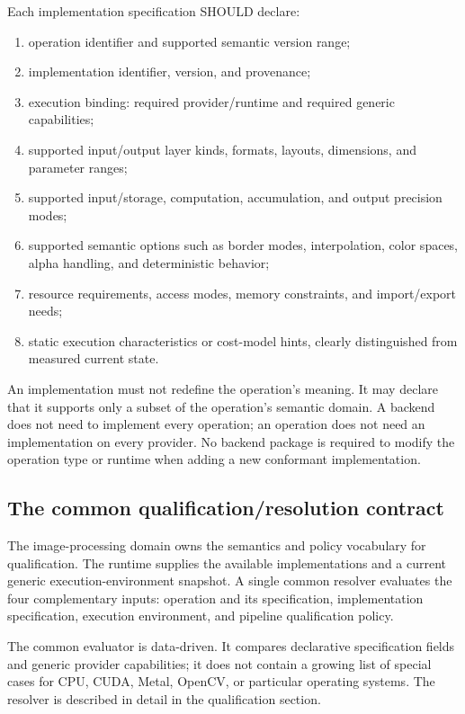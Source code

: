 \documentclass[11pt,a4paper,oneside]{article}
\begin{document}
Each implementation specification SHOULD declare:
\begin{enumerate}
  \item operation identifier and supported semantic version range;
  \item implementation identifier, version, and provenance;
  \item execution binding: required provider/runtime and required generic capabilities;
  \item supported input/output layer kinds, formats, layouts, dimensions, and parameter ranges;
  \item supported input/storage, computation, accumulation, and output precision modes;
  \item supported semantic options such as border modes, interpolation, color spaces, alpha handling, and deterministic behavior;
  \item resource requirements, access modes, memory constraints, and import/export needs;
  \item static execution characteristics or cost-model hints, clearly distinguished from measured current state.
\end{enumerate}

An implementation must not redefine the operation's meaning. It may declare that it supports only a subset of the operation's semantic domain. A backend does not need to implement every operation; an operation does not need an implementation on every provider. No backend package is required to modify the operation type or runtime when adding a new conformant implementation.

\subsection{The common qualification/resolution contract}

The image-processing domain owns the semantics and policy vocabulary for qualification. The runtime supplies the available implementations and a current generic execution-environment snapshot. A single common resolver evaluates the four complementary inputs: operation and its specification, implementation specification, execution environment, and pipeline qualification policy.

The common evaluator is data-driven. It compares declarative specification fields and generic provider capabilities; it does not contain a growing list of special cases for CPU, CUDA, Metal, OpenCV, or particular operating systems. The resolver is described in detail in the qualification section.
\end{document}
